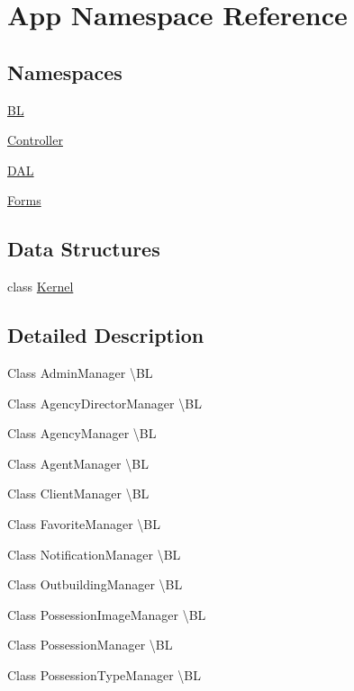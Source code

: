 \hypertarget{namespace_app}{}\section{App Namespace Reference}
\label{namespace_app}
\subsection*{Namespaces}
\begin{DoxyCompactItemize}
\item 
 \mbox{\hyperlink{namespace_app_1_1_b_l}{BL}}
\item 
 \mbox{\hyperlink{namespace_app_1_1_controller}{Controller}}
\item 
 \mbox{\hyperlink{namespace_app_1_1_d_a_l}{D\+AL}}
\item 
 \mbox{\hyperlink{namespace_app_1_1_forms}{Forms}}
\end{DoxyCompactItemize}
\subsection*{Data Structures}
\begin{DoxyCompactItemize}
\item 
class \mbox{\hyperlink{class_app_1_1_kernel}{Kernel}}
\end{DoxyCompactItemize}


\subsection{Detailed Description}
Class Admin\+Manager \textbackslash{}\+BL

Class Agency\+Director\+Manager \textbackslash{}\+BL

Class Agency\+Manager \textbackslash{}\+BL

Class Agent\+Manager \textbackslash{}\+BL

Class Client\+Manager \textbackslash{}\+BL

Class Favorite\+Manager \textbackslash{}\+BL

Class Notification\+Manager \textbackslash{}\+BL

Class Outbuilding\+Manager \textbackslash{}\+BL

Class Possession\+Image\+Manager \textbackslash{}\+BL

Class Possession\+Manager \textbackslash{}\+BL

Class Possession\+Type\+Manager \textbackslash{}\+BL

